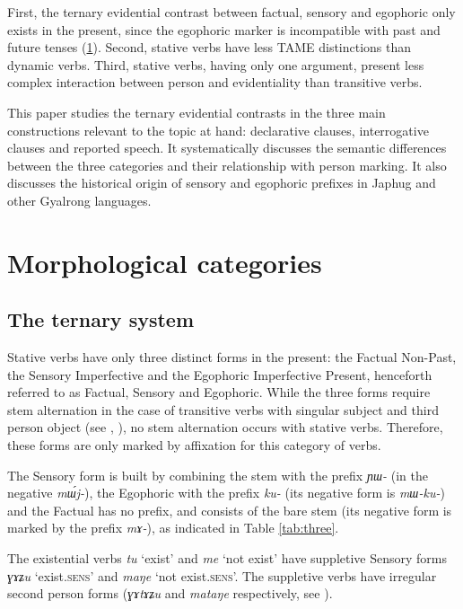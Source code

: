 \documentclass[oldfontcommands,oneside,a4paper,11pt]{article}
\newcommand{\ipa}[1]{{\phon\textit{#1}}} %
\begin{document}
First, the ternary evidential contrast between factual, sensory and egophoric only exists in the present, since the egophoric marker is incompatible with past and future tenses (\ref{sec:morph}). Second, stative verbs have less TAME distinctions than dynamic verbs. Third, stative verbs, having only one argument, present less complex interaction between person and evidentiality than transitive verbs.

This paper studies the ternary evidential contrasts in the three main constructions relevant to the topic at hand: declarative clauses, interrogative clauses and reported speech. It systematically discusses the semantic differences between the three categories and their relationship with person marking. It also discusses the historical origin of sensory and egophoric prefixes in Japhug and other Gyalrong languages.


\section{Morphological categories} \label{sec:morph}

\subsection{The ternary system}
Stative verbs have only three distinct forms in the present: the Factual Non-Past, the Sensory Imperfective and the Egophoric Imperfective Present, henceforth referred to as Factual, Sensory and Egophoric. While the three forms require stem alternation in the case of transitive verbs with singular subject and third person object (see \citealt{jackson00sidaba}, \citealt[267]{jacques14linking}), no stem alternation occurs with stative verbs. Therefore, these forms are only marked by affixation for this category of verbs.

The Sensory form is built by combining the stem with the  prefix \ipa{ɲɯ-} (in the negative \ipa{mɯ́j-}), the Egophoric with the prefix \ipa{ku-} (its negative form is \ipa{mɯ-ku-}) and the Factual has no prefix, and consists of the bare stem (its negative form is marked by the prefix \ipa{mɤ-}), as indicated in Table \ref{tab:three}.

The existential verbs \ipa{tu} `exist' and \ipa{me} `not exist' have suppletive Sensory forms \ipa{ɣɤʑu} `exist.\textsc{sens}' and \ipa{maŋe} `not exist.\textsc{sens}'. The suppletive verbs have irregular second person forms (\ipa{ɣɤtɤʑu} and \ipa{mataŋe} respectively, see \citealt{jacques12agreement}).
\end{document}
